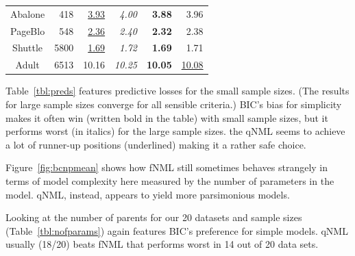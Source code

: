 \begin{table}
\begin{center}
\begin{tabular}{crrrrr}
 Abalone &   418 &  \underline{3.93} &     \textit{4.00} &      \textbf{3.88} &               3.96 \\
 PageBlo &   548 &  \underline{2.36} &     \textit{2.40} &      \textbf{2.32} &               2.38 \\
 Shuttle &  5800 &  \underline{1.69} &     \textit{1.72} &      \textbf{1.69} &               1.71 \\
   Adult &  6513 &             10.16 &    \textit{10.25} &     \textbf{10.05} &  \underline{10.08} \\
\end{tabular}
\end{center}
\end{table}

Table~\ref{tbl:preds} features predictive losses for the small sample
sizes.  (The results for large sample sizes converge for all sensible
criteria.) BIC's bias for simplicity makes it often win (written bold
in the table) with small sample sizes, but it performs worst (in
italics) for the large sample sizes. the qNML seems to achieve a lot
of runner-up positions (underlined) making it a rather safe choice.

Figure~\ref{fig:bcnpmean} shows how fNML still sometimes behaves
strangely in terms of model complexity here measured by the number of
parameters in the model. qNML, instead, appears to yield more
parsimonious models.

Looking at the number of parents for our 20 datasets and sample
sizes (Table~\ref{tbl:nofparams}) again features BIC's preference for
simple models. qNML usually (18/20) beats fNML that performs worst in
14 out of 20 data sets.

